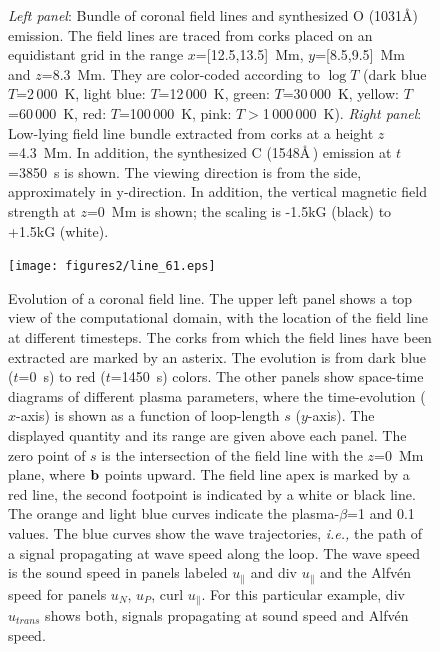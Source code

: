 \documentclass{aa}
\begin{document}
{\begin{figure}[!h]
\begin{minipage}{12cm}
\end{minipage}
\caption{{\emph{Left panel}}: Bundle of coronal field lines and synthesized O{} (1031\AA) emission. The field lines are traced from corks placed on an equidistant grid in the range $x$=[12.5,13.5]~Mm, $y$=[8.5,9.5]~Mm and $z$=8.3~Mm. They are color-coded according to $\log T$ (dark blue $T$=2\,000~K, light blue: $T$=12\,000~K, green: $T$=30\,000~K, yellow: $T$=60\,000~K, red: $T$=100\,000~K, pink: $T>$1\,000\,000~K). {\emph{Right panel}}: Low-lying field line bundle extracted from corks at a height $z$=4.3~Mm. In addition, the synthesized C{} (1548\AA\,) emission at $t$=3850~s is shown. 
The viewing direction is from the side, approximately in y-direction. In addition, the vertical magnetic field strength at $z$=0~Mm is shown; the scaling is -1.5kG (black) to +1.5kG (white).\label{fig_highloops}}



\end{figure}


\begin{figure}[]
\begin{center}
\texttt{[image: figures2/line\_61.eps]}
\end{center}
\caption{Evolution of a coronal field line. The upper left panel shows a top view of the computational domain, with the location of the field line at different timesteps. The corks from which the field lines have been extracted are marked by an asterix. The evolution is from dark blue ($t$=0~s) to red ($t$=1450~s) colors. The other panels show space-time diagrams of different plasma parameters, where the time-evolution ($x$-axis) is shown as a function of loop-length $s$ ($y$-axis). The displayed quantity and its range are given above each panel. The zero point of $s$ is the intersection of the field line with the $z$=0~Mm plane, where ${\bf{b}}$ points upward. The field line apex is marked by a red line, the second footpoint is indicated by a white or black line. The orange and light blue curves indicate the plasma-$\beta$=1 and 0.1 values. The blue curves show the wave trajectories, {\emph{i.e.,}} the path of a signal propagating at wave speed along the loop. The wave speed is the sound speed in panels labeled $u_{\parallel}$ and div $u_{\parallel}$ and the Alfv\'en speed for panels $u_N$, $u_P$, curl $u_{\parallel}$. For this particular example, div $u_{trans}$ shows both, signals propagating at sound speed and Alfv\'en speed.\label{fig_stmaps_highloops}}
\end{figure}


}
\end{document}
